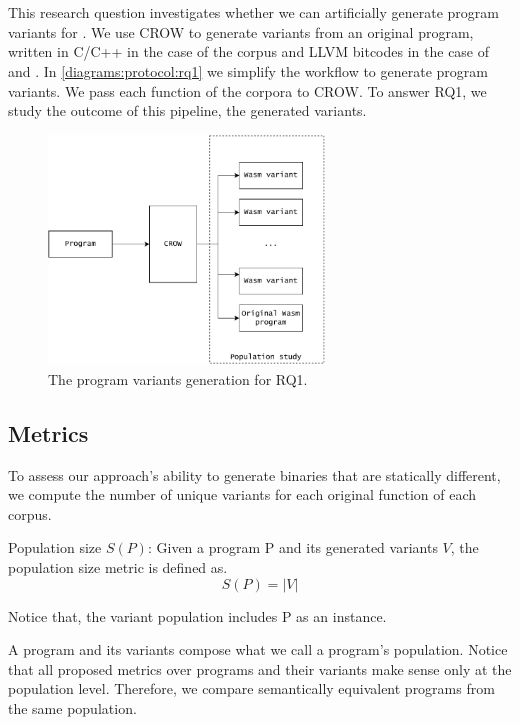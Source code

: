 
\section{\rqone}
\label{rq1:method}
This research question investigates whether we can artificially generate program variants for \wasm. We use CROW to generate variants from an original program, written in C/C++ in the case of the \corpusrosetta corpus and LLVM bitcodes in the case of \corpussodium and \corpusqrcode. 
In \autoref{diagrams:protocol:rq1} we simplify the workflow to generate \wasm program variants. We pass each function of the corpora to CROW. To answer RQ1, we study the outcome of this pipeline, the generated variants. 


\begin{figure}[h]
    \centering
    \includegraphics[height=2.4in]{diagrams/Rq1.pdf}
    \caption{The program variants generation for RQ1.}
    \label{diagrams:protocol:rq1}
\end{figure}


\subsection*{Metrics}

To assess our approach's ability to generate \wasm binaries that are statically different, we compute the number of unique variants for each original function of each corpus. 

\begin{metric}{Population size $S(P)$:}\label{metric:md5sum}
    Given a program P and its generated variants $V$, the population size metric is defined as.\\
    $$
        S(P)=|V|
    $$

    Notice that, the variant population includes P as an instance.
\end{metric}

A program and its variants compose what we call a program's population. Notice that all proposed metrics over programs and their variants make sense only at the population level. Therefore, we compare semantically equivalent programs from the same population.

